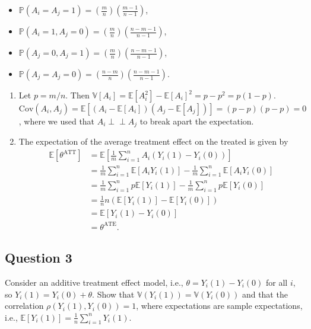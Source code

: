\documentclass[
  letterpaper,
  DIV=11,
  numbers=noendperiod]{scrartcl}
\providecommand{\tightlist}{%
  \setlength{\itemsep}{0pt}\setlength{\parskip}{0pt}}\usepackage{longtable,booktabs,array}
\newcommand{\E}{\mathbb{E}}
\newcommand{\V}{\mathbb{V}}
\newcommand{\Cov}{\text{Cov}}
\renewcommand{\P}{\mathbb{P}}
\newcommand\independent{\perp\!\!\!\perp}
\begin{document}
\begin{itemize}
\tightlist
\item
  \(\P(A_i = A_j = 1) = \left( \frac{m}{n} \right) \left( \frac{m-1}{n-1} \right)\),
\item
  \(\P(A_i = 1, A_j = 0) = \left( \frac{m}{n} \right) \left( \frac{n-m-1}{n-1} \right)\),
\item
  \(\P(A_j = 0, A_j = 1) = \left( \frac{m}{n} \right) \left( \frac{n-m-1}{n-1} \right)\),
\item
  \(\P(A_j = A_j = 0) = \left( \frac{n-m}{n} \right) \left( \frac{n-m-1}{n-1} \right)\).
\end{itemize}

\begin{enumerate}
\def\labelenumi{\alph{enumi})}
\setcounter{enumi}{2}
\tightlist
\item
  Let \(p = m/n\). Then
  \(\V[A_i] = \E[A_i^2] - \E[A_i]^2 = p - p^2 = p(1-p)\).
  \(\Cov(A_i, A_j) = \E[(A_i - \E[A_i])(A_j - \E[A_j])] = (p - p)(p-p) = 0\),
  where we used that \(A_i \independent A_j\) to break apart the
  expectation.
\item
  The expectation of the average treatment effect on the treated is
  given by \[
    \begin{aligned}
    \E[\theta^{\text{ATT}}] & = \E[\frac{1}{m} \sum_{i=1}^n A_i (Y_i(1) - Y_i(0))] \\
    & = \frac{1}{m} \sum_{i=1}^n \E[A_i Y_i(1)] - \frac{1}{m} \sum_{i=1}^n \E[A_i Y_i(0)] \\ 
    & = \frac{1}{m} \sum_{i=1}^n p \E[Y_i(1)] - \frac{1}{m} \sum_{i=1}^n p \E[Y_i(0)] \\ 
    & = \frac{1}{n} n (\E[Y_i(1)] - \E[Y_i(0)]) \\ 
    & = \E[Y_i(1) - Y_i(0)] \\ 
    & = \theta^{\text{ATE}}.
    \end{aligned}
    \]
\end{enumerate}

\newpage

\hypertarget{question-3}{%
\subsection{Question 3}\label{question-3}}

Consider an additive treatment effect model, i.e.,
\(\theta = Y_i(1) - Y_i(0)\) for all \(i\), so
\(Y_i(1) = Y_i(0) + \theta\). Show that \(\V(Y_i(1)) = \V(Y_i(0))\) and
that the correlation \(\rho(Y_i(1), Y_i(0)) = 1\), where expectations
are sample expectations, i.e.,
\(\E[Y_i(1)] = \frac{1}{n} \sum_{i=1}^{n} Y_i(1)\).
\end{document}
